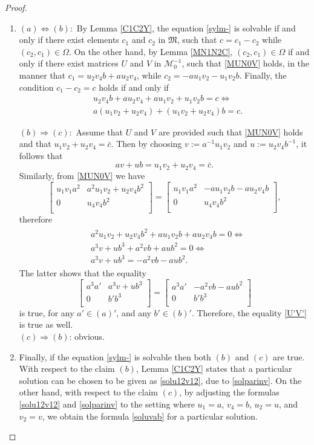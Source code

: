 \documentclass{article}
\theoremstyle{definition}
\def\M{\mathfrak{M}}
\newcommand{\mat}[4]{\left[\begin{array}{cc}#1 & #2 \\ #3 & #4 \\
	\end{array}\right]}
\begin{document}
\begin{proof}\begin{enumerate}
\item $(a)\Leftrightarrow(b):$ By Lemma \ref{C1C2Y}, the equation \eqref{sylm-} is solvable if and only if there exist elements $c_1$ and $c_2$ in $\M$, such that $c=c_1-c_2$ while $(c_2,c_1)\in\Omega$. On the other hand, by Lemma \ref{MN1N2C}, $(c_2,c_1)\in\Omega$ if and only if there exist matrices $U$ and $V$ in $\mathcal{M}^{-1}_0$, such that \eqref{MUN0V} holds, in the manner that  $c_1=u_2v_4b+au_2v_4$, while $c_2=-au_1v_2-u_1v_2b$. Finally, the condition $c_1-c_2=c$ holds if and only if
$$\begin{aligned}
&u_2v_4b+au_2v_4+au_1v_2+u_1v_2b=c\Leftrightarrow\\
&a(u_1v_2+u_2v_4)+(u_1v_2+u_2v_4)b=c.\end{aligned}$$

\noindent$(b)\Rightarrow (c):$ Assume that $U$ and $V$ are provided such that \eqref{MUN0V} holds and that $u_1v_2+u_2v_4=\bar{c}$. Then by choosing $v:=a^{-1}u_1v_2$ and $u:=u_2v_4b^{-1}$, it follows that
$$av+ub=u_1v_2+u_2v_4=\bar{c}.$$
Similarly, from \eqref{MUN0V} we have
$$\mat{u_1v_1a^2}{a^2u_1v_2+u_2v_4b^2}{0}{u_4v_4b^2}=\mat{u_1v_1a^2}{-au_1v_2b-au_2v_4b}{0}{u_4v_4b^2},$$
therefore
\begin{eqnarray}\label{consistency}\begin{aligned}
&a^2u_1v_2+u_2v_4b^2+au_1v_2b+au_2v_4b=0\Leftrightarrow\\
&a^3v+ub^3+a^2vb+aub^2=0\Leftrightarrow\\
&a^3v+ub^3=-a^2vb-aub^2.\end{aligned}
\end{eqnarray}
The latter shows that the equality
\begin{equation}\label{matmain}\mat{a^3a'}{a^3v+ub^3}{0}{b'b^3}=\mat{a^3a'}{-a^2vb-aub^2}{0}{b'b^3}\end{equation}
is true, for any $a'\in(a)'$, and any $b'\in(b)'$. Therefore, the equality \eqref{U'V'} is true as well.\\

$(c)\Rightarrow(b)$: obvious.
\item Finally, if the equation \eqref{sylm-} is solvable then both $(b)$ and $(c)$ are true. With respect to the claim $(b)$, Lemma \ref{C1C2Y} states that a particular solution can be chosen to be given as \eqref{solu12v12}, due to \eqref{solparinv}. On the other hand, with respect to the claim $(c)$, by adjusting the formulas \eqref{solu12v12} and \eqref{solparinv} to the setting where $u_1=a$, $v_4=b$, $u_2=u$, and $v_2=v$, we obtain the formula \eqref{soluvab} for a particular solution. 
\end{enumerate}
\end{proof}
\end{document}
